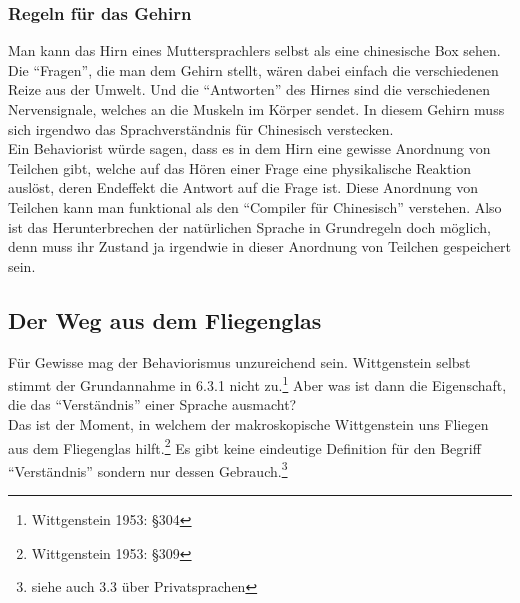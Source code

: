 \documentclass[10pt,a4paper]{article}
\begin{document}
\subsubsection{Regeln für das Gehirn}
Man kann das Hirn eines Muttersprachlers selbst als eine chinesische Box sehen. Die \enquote{Fragen}, die man dem Gehirn stellt, wären dabei einfach die verschiedenen Reize aus der Umwelt. Und die \enquote{Antworten} des Hirnes sind die verschiedenen Nervensignale, welches an die Muskeln im Körper sendet. In diesem Gehirn muss sich irgendwo das Sprachverständnis für Chinesisch verstecken. \\
Ein Behaviorist würde sagen, dass es in dem Hirn eine gewisse Anordnung von Teilchen gibt, welche auf das Hören einer Frage eine physikalische Reaktion auslöst, deren Endeffekt die Antwort auf die Frage ist. Diese Anordnung von Teilchen kann man funktional als den \enquote{Compiler für Chinesisch} verstehen. Also ist das Herunterbrechen der natürlichen Sprache in Grundregeln doch möglich, denn muss ihr Zustand ja irgendwie in dieser Anordnung von Teilchen gespeichert sein.

\subsection{Der Weg aus dem Fliegenglas}
Für Gewisse mag der Behaviorismus unzureichend sein. Wittgenstein selbst stimmt der Grundannahme in 6.3.1 nicht zu.\footnote{Wittgenstein 1953: §304} Aber was ist dann die Eigenschaft, die das \enquote{Verständnis} einer Sprache ausmacht? \\
Das ist der Moment, in welchem der makroskopische Wittgenstein uns Fliegen aus dem Fliegenglas hilft.\footnote{Wittgenstein 1953: §309} Es gibt keine eindeutige Definition für den Begriff \enquote{Verständnis} sondern nur dessen Gebrauch.\footnote{siehe auch 3.3 über Privatsprachen}
\end{document}
